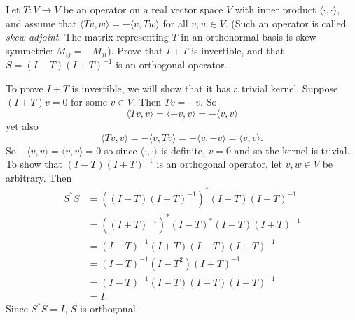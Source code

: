 \begin{problem}
Let $T:V\to V$ be an operator on a real vector space $V$ with inner product $\langle \cdot,\cdot\rangle$, and assume that $\langle Tv,w\rangle=-\langle v,Tw\rangle$ for all $v,w\in V$. (Such an operator is called {\em skew-adjoint}. The matrix representing $T$ in an orthonormal basis is skew-symmetric: $M_{ij}=-M_{ji}$). Prove that $I+T$ is invertible, and that $S=(I-T)(I+T)^{-1}$ is an orthogonal operator.
\end{problem}

To prove $I+T$ is invertible, we will show that it has a trivial kernel. Suppose $(I+T)v=0$ for some $v\in V$. Then $Tv=-v$. So
\[
  \langle Tv, v\rangle = \langle -v, v\rangle = -\langle v, v\rangle
\]
yet also
\[
  \langle Tv, v\rangle = -\langle v, Tv\rangle = -\langle v, -v\rangle = \langle v, v\rangle
.\]
So $-\langle v, v\rangle = \langle v, v\rangle = 0$ so since $\langle \cdot, \cdot \rangle$ is definite, $v=0$ and so the kernel is trivial.
To show that $(I-T)(I+T)^{-1}$ is an orthogonal operator, let $v,w\in V$ be arbitrary. Then
\[
  \begin{aligned}
    S^*S&=((I-T)(I+T)^{-1})^*(I-T)(I+T)^{-1}\\
    &=\left((I+T)^{-1}\right)^*(I-T)^*(I-T)(I+T)^{-1}\\
    &= (I-T)^{-1}(I+T)(I-T)(I+T)^{-1}\\
    &= (I-T)^{-1}(I-T^2)(I+T)^{-1}\\
    &= (I-T)^{-1}(I-T)(I+T)(I+T)^{-1}\\
    &= I.
  \end{aligned}
\]
Since $S^*S=I$, $S$ is orthogonal.